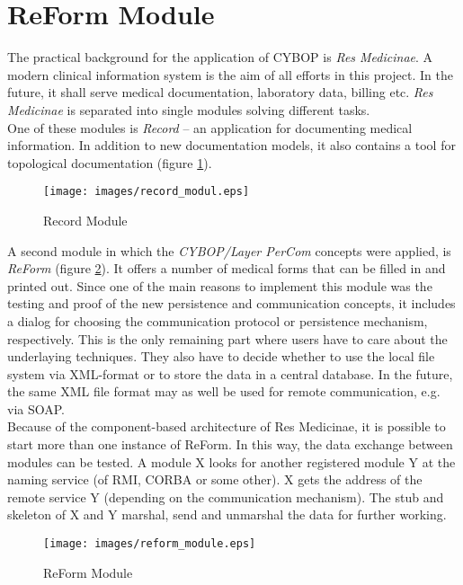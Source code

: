 \section{ReForm Module}
\label{reform_module_section}

The practical background for the application of CYBOP is \emph{Res Medicinae}.
A modern clinical information system is the aim of all efforts in this project.
In the future, it shall serve medical documentation, laboratory data, billing etc.
\emph{Res Medicinae} is separated into single modules solving different tasks.\\
One of these modules is \emph{Record} -- an application for documenting medical
information. In addition to new documentation models, it also contains a tool
for topological documentation (figure \ref{record_module_figure}).

\begin{figure}[ht]
    \begin{center}
       \texttt{[image: images/record\_modul.eps]}
       \caption{Record Module \cite{urban}}
       \label{record_module_figure}
    \end{center}
\end{figure}

A second module in which the \emph{CYBOP/Layer PerCom} concepts were applied,
is \emph{ReForm} (figure \ref{reform_module_figure}). It offers a number of
medical forms that can be filled in and printed out. Since one of the main reasons
to implement this module was the testing and proof of the new persistence and
communication concepts, it includes a dialog for choosing the communication protocol
or persistence mechanism, respectively. This is the only remaining part where users
have to care about the underlaying techniques. They also have to decide whether to
use the local file system via XML-format or to store the data in a central database.
In the future, the same XML file format may as well be used for remote communication,
e.g. via SOAP.\\
Because of the component-based architecture of Res Medicinae, it is possible to
start more than one instance of ReForm. In this way, the data exchange between
modules can be tested. A module X looks for another registered module Y at the
naming service (of RMI, CORBA or some other). X gets the address of the remote
service Y (depending on the communication mechanism). The stub and skeleton of X
and Y marshal, send and unmarshal the data for further working.

\begin{figure}[ht]
    \begin{center}
       \texttt{[image: images/reform\_module.eps]}
       \caption{ReForm Module}
       \label{reform_module_figure}
    \end{center}
\end{figure}
